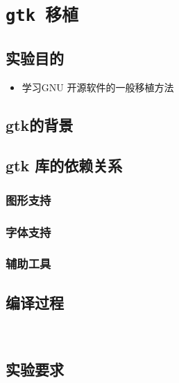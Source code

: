 \chapter{\tt gtk 移植}
\section{实验目的}
\begin{itemize}\itemsep=-3pt
  \item 学习GNU 开源软件的一般移植方法
\end{itemize}

\section{gtk的背景}

\section{gtk 库的依赖关系}
\subsection{图形支持}
\newpage
\subsection{字体支持}
\newpage
\subsection{辅助工具}

\section{编译过程}
\newpage \ \ \ \newpage

\section{实验要求}
  
\clearpage

